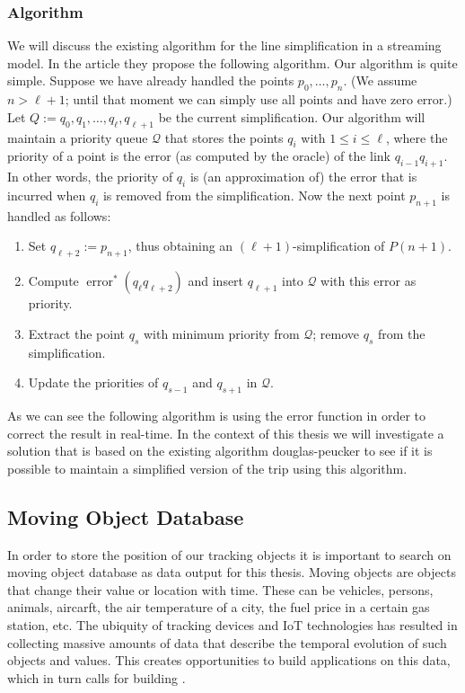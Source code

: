 \documentclass[twoside,12pt, a4paper]{report}
\begin{document}
\subsubsection{Algorithm}
We will discuss the existing algorithm for the line simplification in a streaming model. In the article \cite{abam2007streaming} they propose
the following algorithm. Our algorithm is quite simple. Suppose we have already handled the points $p_0, \ldots, p_n$.
(We assume $n>\ell+1$; until that moment we can simply use all points and have zero error.) Let $Q:=q_0, q_1, \ldots, q_{\ell}, q_{\ell+1}$
be the current simplification. Our algorithm will maintain a priority queue $\mathcal{Q}$ that stores the points $q_i$ with $1 \leqslant i \leqslant \ell$,
where the priority of a point is the error (as computed by the oracle) of the link $q_{i-1} q_{i+1}$. In other words, the priority of $q_i$ is
(an approximation of) the error that is incurred when $q_i$ is removed from the simplification. Now the next point $p_{n+1}$ is handled as follows:

\begin{enumerate}
	\item  Set $q_{\ell+2}:=p_{n+1}$, thus obtaining an $(\ell+1)$-simplification of $P(n+1)$.
	\item  Compute $\operatorname{error}^*\left(q_{\ell} q_{\ell+2}\right)$ and insert $q_{\ell+1}$ into $\mathcal{Q}$ with this error as priority.
	\item  Extract the point $q_s$ with minimum priority from $\mathcal{Q}$; remove $q_s$ from the simplification.
	\item  Update the priorities of $q_{s-1}$ and $q_{s+1}$ in $\mathcal{Q}$.
	
\end{enumerate}

As we can see the following algorithm is using the error function in order to correct the result in real-time. In the context of this thesis we will investigate a solution
that is based on the existing algorithm douglas-peucker to see if it is possible to maintain a simplified version of the trip using this algorithm.




\subsection{Moving Object Database}
In order to store the position of our tracking objects it is important to
search on moving object database as data output for this thesis. Moving objects are objects that change their value or location
with time. These can be vehicles, persons, animals, aircarft, the air
temperature of a city, the fuel price in a certain gas station, etc.
The ubiquity of tracking devices and IoT technologies has resulted
in collecting massive amounts of data that describe the temporal
evolution of such objects and values. This creates opportunities
to build applications on this data, which in turn calls for building \cite{zimanyi2019mobilitydb}.
\end{document}
